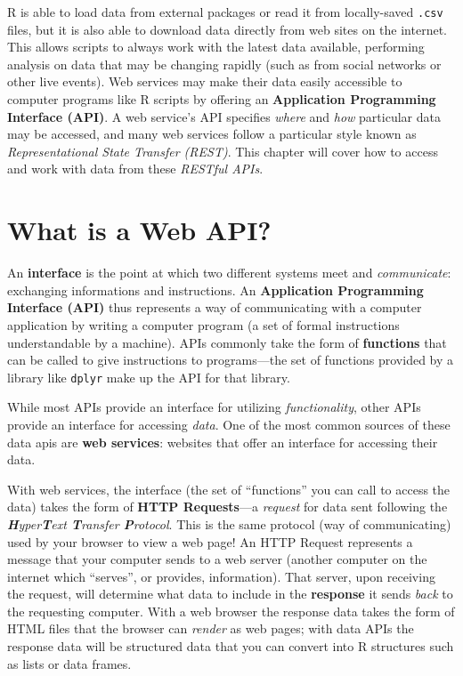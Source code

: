\documentclass[]{book}
\theoremstyle{definition}
\theoremstyle{definition}
\theoremstyle{remark}
\begin{document}
R is able to load data from external packages or read it from
locally-saved \texttt{.csv} files, but it is also able to download data
directly from web sites on the internet. This allows scripts to always
work with the latest data available, performing analysis on data that
may be changing rapidly (such as from social networks or other live
events). Web services may make their data easily accessible to computer
programs like R scripts by offering an \textbf{Application Programming
Interface (API)}. A web service's API specifies \emph{where} and
\emph{how} particular data may be accessed, and many web services follow
a particular style known as \emph{Representational State Transfer
(REST)}. This chapter will cover how to access and work with data from
these \emph{RESTful APIs}.

\section{What is a Web API?}\label{what-is-a-web-api}

An \textbf{interface} is the point at which two different systems meet
and \emph{communicate}: exchanging informations and instructions. An
\textbf{Application Programming Interface (API)} thus represents a way
of communicating with a computer application by writing a computer
program (a set of formal instructions understandable by a machine). APIs
commonly take the form of \textbf{functions} that can be called to give
instructions to programs---the set of functions provided by a library
like \texttt{dplyr} make up the API for that library.

While most APIs provide an interface for utilizing \emph{functionality},
other APIs provide an interface for accessing \emph{data}. One of the
most common sources of these data apis are \textbf{web services}:
websites that offer an interface for accessing their data.

With web services, the interface (the set of ``functions'' you can call
to access the data) takes the form of \textbf{HTTP Requests}---a
\emph{request} for data sent following the
\emph{\textbf{H}yper\textbf{T}ext \textbf{T}ransfer \textbf{P}rotocol}.
This is the same protocol (way of communicating) used by your browser to
view a web page! An HTTP Request represents a message that your computer
sends to a web server (another computer on the internet which
``serves'', or provides, information). That server, upon receiving the
request, will determine what data to include in the \textbf{response} it
sends \emph{back} to the requesting computer. With a web browser the
response data takes the form of HTML files that the browser can
\emph{render} as web pages; with data APIs the response data will be
structured data that you can convert into R structures such as lists or
data frames.
\end{document}
